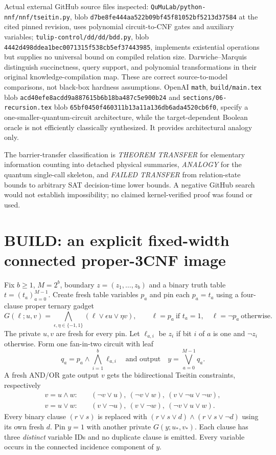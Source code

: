 \documentclass[11pt]{article}
\begin{document}
Actual external GitHub source files inspected: \texttt{QuMuLab/python-nnf/nnf/tseitin.py}, blob \texttt{d7be8fe444aa522b09bf45f81052bf5213d37584} at the cited pinned revision, uses polynomial circuit-to-CNF gates and auxiliary variables; \texttt{tulip-control/dd/dd/bdd.py}, blob \texttt{4442d498ddea1bec0071315f538cb5ef37443985}, implements existential operations but supplies no universal bound on compiled relation size. Darwiche--Marquis distinguish succinctness, query support, and polynomial transformations in their original knowledge-compilation map. These are correct source-to-model comparisons, not black-box hardness assumptions. OpenAI \texttt{math}, \texttt{build/main.tex} blob \texttt{acd40efe8acdd9a887615b6b18ba487c5e900b24} and \texttt{sections/06-recursion.tex} blob \texttt{65bf0450f460311b13a11a136db6ada4520cb6f0}, specify a one-smaller-quantum-circuit architecture, while the target-dependent Boolean oracle is not efficiently classically synthesized. It provides architectural analogy only.

The barrier-transfer classification is \emph{THEOREM TRANSFER} for elementary information counting into detached physical summaries, \emph{ANALOGY} for the quantum single-call skeleton, and \emph{FAILED TRANSFER} from relation-state bounds to arbitrary SAT decision-time lower bounds. A negative GitHub search would not establish impossibility; no claimed kernel-verified proof was found or used.

\section{BUILD: an explicit fixed-width connected proper-3CNF image}
Fix $b\ge1$, $M=2^b$, boundary $z=(z_1,\ldots,z_b)$ and a binary truth table $t=(t_a)_{a=0}^{M-1}$. Create fresh table variables $p_a$ and pin each $p_a=t_a$ using a four-clause proper ternary gadget
\[
 G(\ell;u,v)=\bigwedge_{\epsilon,\eta\in\{-1,1\}}
 (\ell\vee\epsilon u\vee\eta v),\qquad
 \ell=p_a\ \text{if }t_a=1,\quad\ell=\neg p_a\ \text{otherwise}.
\]
The private $u,v$ are fresh for every pin. Let $\ell_{a,i}$ be $z_i$ if bit $i$ of $a$ is one and $\neg z_i$ otherwise. Form one fan-in-two circuit with leaf
\[
 q_a=p_a\wedge\bigwedge_{i=1}^{b}\ell_{a,i}
 \quad\text{and output}\quad
 y=\bigvee_{a=0}^{M-1}q_a.
\]
A fresh AND/OR gate output $v$ gets the bidirectional Tseitin constraints, respectively
\[
\begin{aligned}
 v=u\wedge w:\quad&
 (\neg v\vee u),\ (\neg v\vee w),\ (v\vee\neg u\vee\neg w),\\
 v=u\vee w:\quad&
 (v\vee\neg u),\ (v\vee\neg w),\ (\neg v\vee u\vee w).
\end{aligned}
\]
Every binary clause $(r\vee s)$ is replaced with
$(r\vee s\vee d)\wedge(r\vee s\vee\neg d)$ using its own fresh $d$. Pin $y=1$ with another private $G(y;u_*,v_*)$. Each clause has three \emph{distinct} variable IDs and no duplicate clause is emitted. Every variable occurs in the connected incidence component of $y$.
\end{document}
